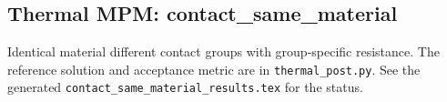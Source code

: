 \subsection{Thermal MPM: contact\_same\_material}
Identical material different contact groups with group-specific resistance. The reference solution and acceptance metric are in \texttt{thermal\_post.py}. See the generated \texttt{contact\_same\_material\_results.tex} for the status.
